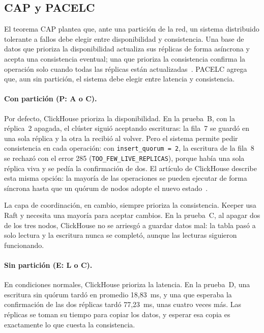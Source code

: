 \documentclass[12pt,a4paper]{article}
\begin{document}
\subsection{CAP y PACELC}

El teorema CAP plantea que, ante una partición de la red, un sistema
distribuido tolerante a fallos debe elegir entre disponibilidad y
consistencia. Una base de datos que prioriza la disponibilidad actualiza
sus réplicas de forma asíncrona y acepta una consistencia eventual; una
que prioriza la consistencia confirma la operación solo cuando todas las
réplicas están actualizadas~\cite[p.~3]{ferreira2024}. PACELC agrega que,
aun sin partición, el sistema debe elegir entre latencia y consistencia.

\paragraph{Con partición (P: A o C).} Por defecto, ClickHouse prioriza la
disponibilidad. En la prueba~B, con la réplica~2 apagada, el clúster
siguió aceptando escrituras: la fila~7 se guardó en una sola réplica y
la otra la recibió al volver. Pero el sistema permite pedir consistencia
en cada operación: con \texttt{insert\_quorum = 2}, la escritura de la
fila~8 se rechazó con el error 285 (\texttt{TOO\_FEW\_LIVE\_REPLICAS}),
porque había una sola réplica viva y se pedía la confirmación de dos.
El artículo de ClickHouse describe esta misma opción: la mayoría de las
operaciones se pueden ejecutar de forma síncrona hasta que un quórum de
nodos adopte el nuevo estado~\cite[p.~3736]{schulze2024}.

La capa de coordinación, en cambio, siempre prioriza la consistencia.
Keeper usa Raft y necesita una mayoría para aceptar cambios. En la
prueba~C, al apagar dos de los tres nodos, ClickHouse no se arriesgó a
guardar datos mal: la tabla pasó a solo lectura y la escritura nunca se
completó, aunque las lecturas siguieron funcionando.

\paragraph{Sin partición (E: L o C).} En condiciones normales, ClickHouse
prioriza la latencia. En la prueba~D, una escritura sin quórum tardó en
promedio 18,83~ms, y una que esperaba la confirmación de las dos
réplicas tardó 77,23~ms, unas cuatro veces más. Las réplicas se toman su
tiempo para copiar los datos, y esperar esa copia es exactamente lo que
cuesta la consistencia.
\end{document}

